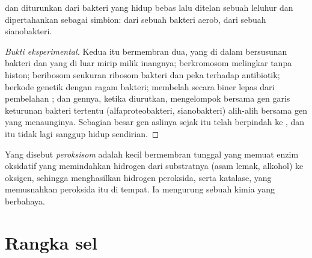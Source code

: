 \begin{proposition}\label{prop:b1:eukaryotic-cell:endosymbiosis}
 dan  diturunkan dari bakteri yang hidup bebas lalu
ditelan sebuah  leluhur dan dipertahankan sebagai simbion:
 dari sebuah bakteri aerob,  dari sebuah sianobakteri.
\end{proposition}
\begin{proof}[Bukti eksperimental]
Kedua  itu bermembran dua, yang di dalam bersusunan bakteri dan
yang di luar mirip milik inangnya; berkromosom melingkar tanpa histon;
beribosom seukuran ribosom bakteri dan peka terhadap antibiotik;
berkode genetik dengan ragam bakteri; membelah secara biner lepas dari
pembelahan ; dan gennya, ketika diurutkan, mengelompok bersama
gen garis keturunan bakteri tertentu (alfaproteobakteri, sianobakteri)
alih-alih bersama gen  yang menaunginya. Sebagian besar gen
aslinya sejak itu telah berpindah ke , dan  itu tidak lagi
sanggup hidup sendirian.
\end{proof}

\begin{definition}[Peroksisom]\label{def:b1:eukaryotic-cell:peroxisome}
Yang disebut \emph{peroksisom} adalah  kecil
bermembran tunggal yang memuat enzim oksidatif yang memindahkan
hidrogen dari substratnya (asam lemak, alkohol) ke oksigen, sehingga
menghasilkan hidrogen peroksida, serta katalase, yang memusnahkan
peroksida itu di tempat. Ia mengurung sebuah kimia yang berbahaya.
\end{definition}

\section{Rangka sel}

